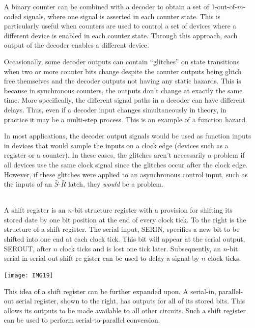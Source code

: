 \documentclass[10pt,a4paper]{article}
\begin{document}
\begin{itemize}
\item A binary counter can be combined with a decoder to obtain a set of 1-out-of-$m$-coded signals, where one signal is asserted in each counter state. This is particularly useful when counters are used to control a set of devices where a different device is enabled in each counter state. Through this approach, each output of the decoder enables a different device.
\item Occasionally, some decoder outputs can contain ``glitches'' on state transitions when two or more counter bits change despite the counter outputs being glitch free themselves and the decoder outputs not having any static hazards. This is because in synchronous counters, the outputs don't change at exactly the same time. More specifically, the different signal paths in a decoder can have different delays. Thus, even if a decoder input changes simultaneously in theory, in practice it may be a multi-step process. This is an example of a function hazard.
\item In most applications, the decoder output signals would be used as function inputs in devices that would sample the inputs on a clock edge (devices such as a register or a counter). In these cases, the glitches aren't necessarily a problem if all devices use the same clock signal since the glitches occur after the clock edge. However, if these glitches were applied to an asynchronous control input, such as the inputs of an $\bar{S}$-$\bar{R}$ latch, they \textit{would} be a problem.\\~\\
\begin{minipage}{.55\textwidth}
\item A shift register is an $n$-bit structure register with a provision for shifting its stored date by one bit position at the end of every clock tick. To the right is the structure of a shift register. The serial input, SERIN, specifies a new bit to be shifted into one end at each clock tick. This bit will appear at the serial output, SEROUT, after $n$ clock ticks and is lost one tick later. Subsequently, an $n$-bit serial-in serial-out shift re gister can be used to delay a signal by $n$ clock ticks.
\end{minipage}
\begin{minipage}{.45\textwidth}
\texttt{[image: IMG19]}
\end{minipage}
\begin{minipage}{.55\textwidth}
\item This idea of a shift register can be further expanded upon. A serial-in, parallel-out serial register, shown to the right, has outputs for all of its stored bits. This allows its outputs to be made available to all other circuits. Such a shift register can be used to perform serial-to-parallel conversion.

\end{minipage}
\end{itemize}
\end{document}
